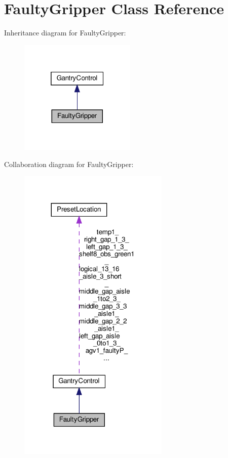 \hypertarget{classFaultyGripper}{}\section{Faulty\+Gripper Class Reference}
\label{classFaultyGripper}


Inheritance diagram for Faulty\+Gripper\+:
\nopagebreak
\begin{figure}[H]
\begin{center}
\leavevmode
\includegraphics[width=157pt]{classFaultyGripper__inherit__graph}
\end{center}
\end{figure}


Collaboration diagram for Faulty\+Gripper\+:
\nopagebreak
\begin{figure}[H]
\begin{center}
\leavevmode
\includegraphics[width=203pt]{classFaultyGripper__coll__graph}
\end{center}
\end{figure}
